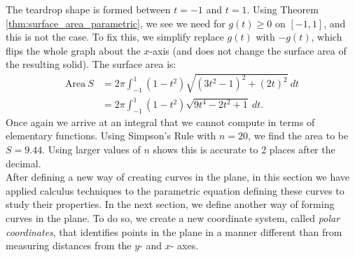 {The teardrop shape is formed between $t=-1$ and $t=1$. Using Theorem \ref{thm:surface_area_parametric}, we see we need for $g(t)\geq 0$ on $[-1,1]$, and this is not the case. To fix this, we simplify replace $g(t)$ with $-g(t)$, which flips the whole graph about the $x$-axis (and does not change the surface area of the resulting solid). The surface area is: 
\begin{align*}
\text{Area}\ S &= 2\pi\int_{-1}^1 (1-t^2)\sqrt{(3t^2-1)^2+(2t)^2}\ dt\\
		&=	2\pi\int_{-1}^1 (1-t^2)\sqrt{9t^4-2t^2+1} \ dt.
		\end{align*}
Once again we arrive at an integral that we cannot compute in terms of elementary functions. Using Simpson's Rule with $n=20$, we find the area to be $S=9.44$. Using larger values of $n$ shows this is accurate to 2 places after the decimal.
}\\

After defining a new way of creating curves in the plane, in this section we have applied calculus techniques to the parametric equation defining these curves to study their properties. In the next section, we define another way of forming curves in the plane. To do so, we create a new coordinate system, called \emph{polar coordinates}, that identifies points in the plane in a manner different than from measuring distances from the $y$- and $x$- axes.

